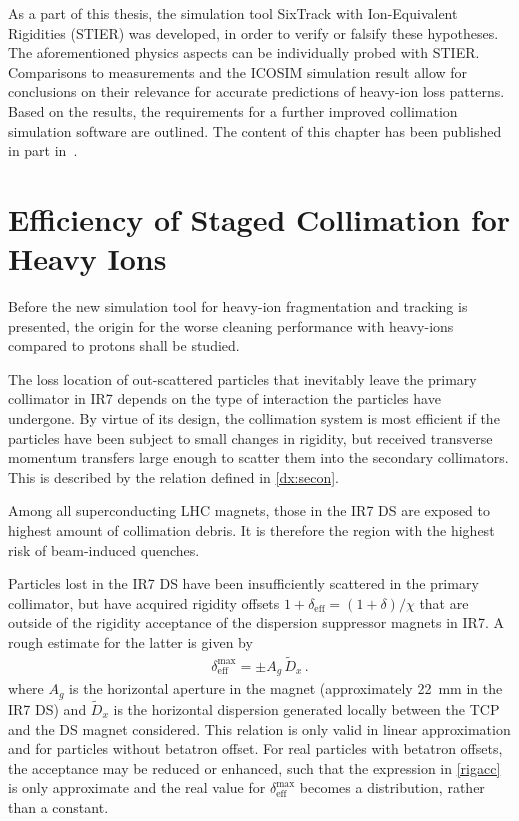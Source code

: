 As a part of this thesis, the simulation tool SixTrack with Ion-Equivalent Rigidities (STIER) was developed, in order to verify or falsify these hypotheses. The aforementioned physics aspects can be individually probed with STIER. Comparisons to measurements and the ICOSIM simulation result allow for conclusions on their relevance for accurate predictions of heavy-ion loss patterns. Based on the results, the requirements for a further improved collimation simulation software are outlined. The content of this chapter has been published in part in~\cite{phermes_hb2014,NIM:819}.



\section{Efficiency of Staged Collimation for Heavy Ions} \label{colleff:ions}

Before the new simulation tool for heavy-ion fragmentation and tracking is presented, the origin for the worse cleaning performance with heavy-ions compared to protons shall be studied. 

The loss location of out-scattered particles that inevitably leave the primary collimator in IR7 depends on the type of interaction the particles have undergone. By virtue of its design, the collimation system is most efficient if the particles have been subject to small changes in rigidity, but received transverse momentum transfers large enough to scatter them into the secondary collimators. This is described by the relation defined in \eqref{dx:secon}. 

Among all superconducting LHC magnets, those in the IR7 DS are exposed to highest amount of collimation debris. It is therefore the region with the highest risk of beam-induced quenches.

Particles lost in the IR7 DS have been insufficiently scattered in the primary collimator, but have acquired rigidity offsets $1+\delta_\text{eff} = (1+\delta)/\chi$ that are outside of the rigidity acceptance of the dispersion suppressor magnets in IR7. A rough estimate for the latter is given by 
%
\begin{align}
  \delta_\text{eff}^\text{max}  = \pm A_g \, \tilde{D}_x \, . \label{rigacc}
\end{align}
%
where $A_g$ is the horizontal aperture in the magnet (approximately 22~mm in the IR7 DS) and $\tilde{D}_x$ is the horizontal dispersion generated locally between the TCP and the DS magnet considered. This relation is only valid in linear approximation and for particles without betatron offset. For real particles with betatron offsets, the acceptance may be reduced or enhanced, such that the expression in \eqref{rigacc} is only approximate and the real value for $\delta_\text{eff}^\text{max}$ becomes a distribution, rather than a constant.



